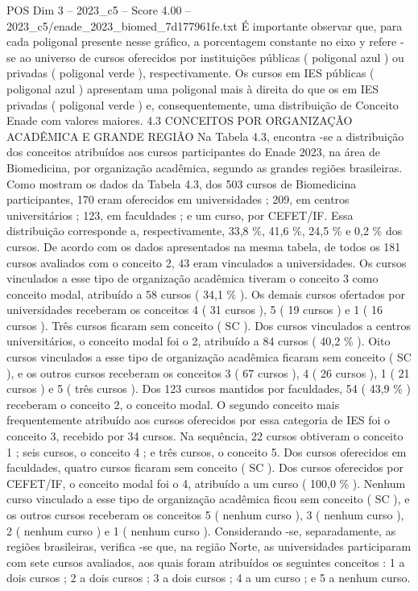\begin{textsample}{POS Dim 3 – 2023\_c5 – Score 4.00 – 2023\_c5/enade\_2023\_biomed\_7d177961fe.txt}
É importante observar que, para cada poligonal presente nesse gráfico, a porcentagem constante no eixo y refere -se ao universo de cursos oferecidos por instituições públicas ( poligonal azul ) ou privadas ( poligonal verde ), respectivamente.
Os cursos em IES públicas ( poligonal azul ) apresentam uma poligonal mais à direita do que os em IES privadas ( poligonal verde ) e, consequentemente, uma distribuição de Conceito Enade com valores maiores. 4.3 CONCEITOS POR ORGANIZAÇÃO ACADÊMICA E GRANDE REGIÃO Na Tabela 4.3, encontra -se a distribuição dos conceitos atribuídos aos cursos participantes do Enade 2023, na área de Biomedicina, por organização acadêmica, segundo as grandes regiões brasileiras.
Como mostram os dados da Tabela 4.3, dos 503 cursos de Biomedicina participantes, 170 eram oferecidos em universidades ; 209, em centros universitários ; 123, em faculdades ; e um curso, por CEFET/IF.
Essa distribuição corresponde a, respectivamente, 33,8 \%, 41,6 \%, 24,5 \% e 0,2 \% dos cursos.
De acordo com os dados apresentados na mesma tabela, de todos os 181 cursos avaliados com o conceito 2, 43 eram vinculados a universidades.
Os cursos vinculados a esse tipo de organização acadêmica tiveram o conceito 3 como conceito modal, atribuído a 58 cursos ( 34,1 \% ).
Os demais cursos ofertados por universidades receberam os conceitos 4 ( 31 cursos ), 5 ( 19 cursos ) e 1 ( 16 cursos ).
Três cursos ficaram sem conceito ( SC ).
Dos cursos vinculados a centros universitários, o conceito modal foi o 2, atribuído a 84 cursos ( 40,2 \% ).
Oito cursos vinculados a esse tipo de organização acadêmica ficaram sem conceito ( SC ), e os outros cursos receberam os conceitos 3 ( 67 cursos ), 4 ( 26 cursos ), 1 ( 21 cursos ) e 5 ( três cursos ).
Dos 123 cursos mantidos por faculdades, 54 ( 43,9 \% ) receberam o conceito 2, o conceito modal.
O segundo conceito mais frequentemente atribuído aos cursos oferecidos por essa categoria de IES foi o conceito 3, recebido por 34 cursos.
Na sequência, 22 cursos obtiveram o conceito 1 ; seis cursos, o conceito 4 ; e três cursos, o conceito 5.
Dos cursos oferecidos em faculdades, quatro cursos ficaram sem conceito ( SC ).
Dos cursos oferecidos por CEFET/IF, o conceito modal foi o 4, atribuído a um curso ( 100,0 \% ).
Nenhum curso vinculado a esse tipo de organização acadêmica ficou sem conceito ( SC ), e os outros cursos receberam os conceitos 5 ( nenhum curso ), 3 ( nenhum curso ), 2 ( nenhum curso ) e 1 ( nenhum curso ).
Considerando -se, separadamente, as regiões brasileiras, verifica -se que, na região Norte, as universidades participaram com sete cursos avaliados, aos quais foram atribuídos os seguintes conceitos : 1 a dois cursos ; 2 a dois cursos ; 3 a dois cursos ; 4 a um curso ; e 5 a nenhum curso.

\end{textsample}
